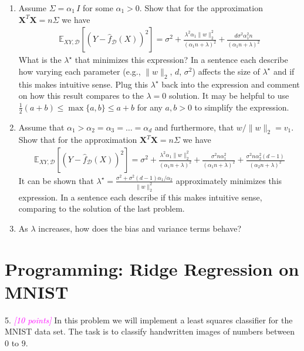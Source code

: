 \documentclass{article}
\newcommand{\1}{\mathbf{1}}
\def\E{\mathbb{E}}
\newcommand{\mb}[1]{\mathbf{#1}}
\newcommand{\mc}[1]{\mathcal{#1}}
\newcommand{\grade}[1]{\small\textcolor{magenta}{\emph{[#1 points]}} \normalsize}
\begin{document}
\begin{enumerate}
    \item Assume $\Sigma= \alpha_1 \, I$ for some $\alpha_1 >0$. Show that for the approximation $\mb{X}^T \mb{X} = n \Sigma$ we have
    \begin{align*}
    \E_{XY,\mc{D}}[ (Y-\widehat{f}_{\mc{D}}(X))^2] = \sigma^2 + \frac{\lambda^2 \alpha_1 \|w\|_2^2}{(\alpha_1 n+\lambda)^2} + \frac{d \sigma^2 \alpha_1^2 n}{(\alpha_1 n + \lambda)^2}
    \end{align*}
    What is the $\lambda^\star$ that minimizes this expression? 
    In a sentence each describe how varying each parameter (e.g., $\|w\|_2$, $d$, $\sigma^2$) affects the size of $\lambda^\star$ and if this makes intuitive sense.
    Plug this $\lambda^\star$ back into the expression and comment on how this result compares to the $\lambda=0$ solution. It may be helpful to use $\tfrac{1}{2}(a+b) \leq \max\{a,b\} \leq a+b$ for any $a,b>0$ to simplify the expression.  
    \item Assume that $\alpha_1 > \alpha_2 = \alpha_3 = \dots = \alpha_d$ and furthermore, that $w/\|w\|_2 = v_1$. Show that for the approximation $\mb{X}^T \mb{X} = n \Sigma$ we have
    \begin{align*}
    \E_{XY,\mc{D}}[ (Y-\widehat{f}_{\mc{D}}(X))^2] = \sigma^2 + \frac{\lambda^2 \alpha_1 \|w\|_2^2}{(\alpha_1 n+\lambda)^2} + \frac{\sigma^2 n \alpha_1^2}{(\alpha_1 n + \lambda)^2} + \frac{\sigma^2 n \alpha_2^2 (d-1)}{(\alpha_2 n + \lambda)^2}
    \end{align*}
    It can be shown that $\lambda^\star = \frac{\sigma^2 + \sigma^2(d-1)\alpha_1/\alpha_2}{\|w\|_2^2}$ approximately minimizes this expression. 
    In a sentence each describe if this makes intuitive sense, comparing to the solution of the last problem.
    \item As $\lambda$ increases, how does the bias and variance terms behave?
     
\end{enumerate}














\section{Programming: Ridge Regression on MNIST}
5. \grade{10} In this problem we will implement a least squares classifier for the MNIST data set. The task
is to classify handwritten images of numbers between $0$ to $9$.\\
\end{document}
